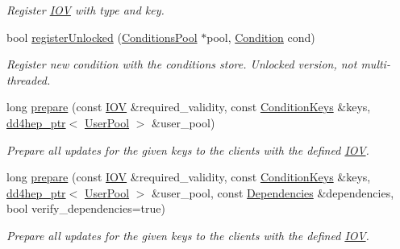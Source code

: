 \begin{DoxyCompactItemize}
\begin{DoxyCompactList}\small\item\em Register \hyperlink{class_d_d4hep_1_1_i_o_v}{IOV} with type and key. \item\end{DoxyCompactList}\item 
bool \hyperlink{class_d_d4hep_1_1_conditions_1_1_conditions_manager_object_a745cd16ef676c16294d450c60617fbd1}{registerUnlocked} (\hyperlink{class_d_d4hep_1_1_conditions_1_1_conditions_pool}{ConditionsPool} $\ast$pool, \hyperlink{class_d_d4hep_1_1_conditions_1_1_condition}{Condition} cond)
\begin{DoxyCompactList}\small\item\em Register new condition with the conditions store. Unlocked version, not multi-\/threaded. \item\end{DoxyCompactList}\item 
long \hyperlink{class_d_d4hep_1_1_conditions_1_1_conditions_manager_object_a897ca111b081fb1c6ed8a39739684d0e}{prepare} (const \hyperlink{class_d_d4hep_1_1_i_o_v}{IOV} \&required\_\-validity, const \hyperlink{class_d_d4hep_1_1_conditions_1_1_conditions_manager_object_aad75140018040c6ad49e56a4d56a35ee}{ConditionKeys} \&keys, \hyperlink{class_d_d4hep_1_1dd4hep__ptr}{dd4hep\_\-ptr}$<$ \hyperlink{class_d_d4hep_1_1_conditions_1_1_user_pool}{UserPool} $>$ \&user\_\-pool)
\begin{DoxyCompactList}\small\item\em Prepare all updates for the given keys to the clients with the defined \hyperlink{class_d_d4hep_1_1_i_o_v}{IOV}. \item\end{DoxyCompactList}\item 
long \hyperlink{class_d_d4hep_1_1_conditions_1_1_conditions_manager_object_a50cd5fe85ead70ca4a0561ca37cbc435}{prepare} (const \hyperlink{class_d_d4hep_1_1_i_o_v}{IOV} \&required\_\-validity, const \hyperlink{class_d_d4hep_1_1_conditions_1_1_conditions_manager_object_aad75140018040c6ad49e56a4d56a35ee}{ConditionKeys} \&keys, \hyperlink{class_d_d4hep_1_1dd4hep__ptr}{dd4hep\_\-ptr}$<$ \hyperlink{class_d_d4hep_1_1_conditions_1_1_user_pool}{UserPool} $>$ \&user\_\-pool, const \hyperlink{class_d_d4hep_1_1_conditions_1_1_conditions_dependency_collection}{Dependencies} \&dependencies, bool verify\_\-dependencies=true)
\begin{DoxyCompactList}\small\item\em Prepare all updates for the given keys to the clients with the defined \hyperlink{class_d_d4hep_1_1_i_o_v}{IOV}. \item\end{DoxyCompactList}\item 

\end{DoxyCompactItemize}

